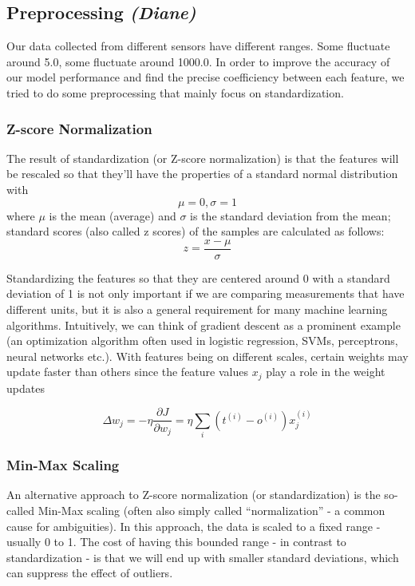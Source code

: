 \documentclass{acm_proc_article-sp}
\begin{document}
\subsection{Preprocessing \textit{(Diane)}}
Our data collected from different sensors have different ranges. Some fluctuate around 5.0, some fluctuate around 1000.0. In order to improve the accuracy of our model performance and find the precise coefficiency between each feature, we tried to do some preprocessing that mainly focus on standardization.
\subsubsection{Z-score Normalization}
The result of standardization (or Z-score normalization) is that the features will be rescaled so that they'll have the properties of a standard normal distribution \cite{Scaling} with 
\[\mu=0, \sigma=1\]
where $\mu$ is the mean (average) and $\sigma$ is the standard deviation from the mean; standard scores (also called z scores) of the samples are calculated as follows:
\begin{equation} z = \frac{x - \mu}{\sigma}\end{equation}

Standardizing the features so that they are centered around 0 with a standard deviation of 1 is not only important if we are comparing measurements that have different units, but it is also a general requirement for many machine learning algorithms. Intuitively, we can think of gradient descent as a prominent example (an optimization algorithm often used in logistic regression, SVMs, perceptrons, neural networks etc.). With features being on different scales, certain weights may update faster than others since the feature values 
$x_j$ play a role in the weight updates

\begin{equation}\Delta w_j = - \eta \frac{\partial J}{\partial w_j} = \eta \sum_i (t^{(i)} - o^{(i)})x^{(i)}_{j}\end{equation}

\subsubsection{Min-Max Scaling}
An alternative approach to Z-score normalization (or standardization) is the so-called Min-Max scaling (often also simply called ``normalization'' - a common cause for ambiguities).
In this approach, the data is scaled to a fixed range - usually 0 to 1.
The cost of having this bounded range - in contrast to standardization - is that we will end up with smaller standard deviations, which can suppress the effect of outliers.
\end{document}
